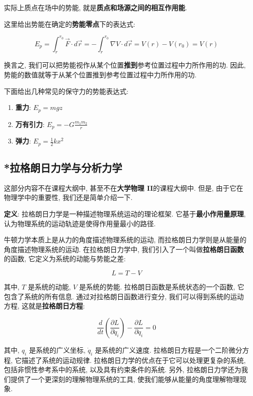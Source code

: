 \documentclass[
  a4paper,
]{ctexrep}
\begin{document}
实际上质点在场中的势能, 就是\textbf{质点和场源之间的相互作用能}.

这里给出势能在确定的\textbf{势能零点}下的表达式:

\[
E_p = \int_{r}^{r_0} \vec{F} \cdot d\vec{r} = -\int_{r}^{r_0} \nabla V \cdot d\vec{r} = V(r) - V(r_0) = V(r)
\]

换言之,
我们可以把势能视作从某个位置\textbf{推到}参考位置过程中力所作用的功.
因此, 势能的数值就等于从某个位置推到参考位置过程中力所作用的功.

下面给出几种常见的保守力的势能表达式:

\begin{enumerate}
\def\labelenumi{\arabic{enumi}.}
\item
  \textbf{重力}: \(E_p = mgz\)
\item
  \textbf{万有引力}: \(E_p = -G \frac{m_1 m_2}{r}\)
\item
  \textbf{弹力}: \(E_p = \frac{1}{2} k x^2\)
\end{enumerate}

\subsection{*拉格朗日力学与分析力学}\label{ux62c9ux683cux6717ux65e5ux529bux5b66ux4e0eux5206ux6790ux529bux5b66}

这部分内容不在课程大纲中, 甚至不在\textbf{大学物理 II}的课程大纲中.
但是, 由于它在物理学中的重要性, 我们还是简单介绍一下.

\textbf{定义}: 拉格朗日力学是一种描述物理系统运动的理论框架.
它基于\textbf{最小作用量原理},
认为物理系统的运动轨迹是使得作用量最小的路径.

牛顿力学本质上是从力的角度描述物理系统的运动,
而拉格朗日力学则是从能量的角度描述物理系统的运动. 在拉格朗日力学中,
我们引入了一个叫做\textbf{拉格朗日函数}的函数,
它定义为系统的动能与势能之差:

\[L = T - V
\]

其中, \(T\) 是系统的动能, \(V\) 是系统的势能.
拉格朗日函数是系统状态的一个函数, 它包含了系统的所有信息.
通过对拉格朗日函数进行变分, 我们可以得到系统的运动方程,
这就是\textbf{拉格朗日方程}:

\[\frac{d}{dt} \left( \frac{\partial L}{\partial \dot{q}_i} \right) - \frac{\partial L}{\partial q_i} = 0\]

其中, \(q_i\) 是系统的广义坐标, \(\dot{q}_i\) 是系统的广义速度.
拉格朗日方程是一个二阶微分方程, 它描述了系统的运动规律.
拉格朗日力学的优点在于它可以处理更复杂的系统, 包括非惯性参考系中的系统,
以及具有约束条件的系统. 另外,
拉格朗日力学还为我们提供了一个更深刻的理解物理系统的工具,
使我们能够从能量的角度理解物理现象.
\end{document}
